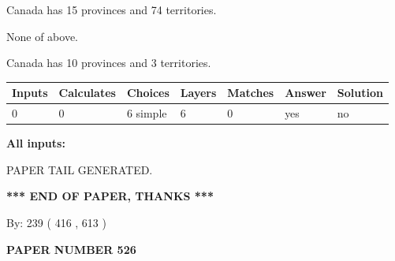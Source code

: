 \documentclass[12pt]{article}
\begin{document}
 
Canada has  15 provinces and  74 territories.
 
 
 None of above.
 
 
\noindent{}
 
 
Canada has 10  provinces and 3 territories.
 
 
\noindent{}
 
 
   
   
   
   
\noindent\begin{tabular}{|l|l|l|l|l|l|l|}
 \hline
Inputs & Calculates & Choices & Layers & Matches & Answer & Solution \\ \hline
 0  & 
 0  & 
 6
  simple  
  & 
 6  & 
 0  & 
  yes & 
  no 
  \\ \hline
 \end{tabular}
   
   
   
   
\noindent{}
   
   
   
   
\noindent\vspace{0.1in}\hspace{-0.08in} {\textbf{\Large{All inputs: }}}
   
   
   
   
   
   
 \vspace{0.2in}
 
   
   
\vspace{2.0in} PAPER TAIL GENERATED.
   
   
   
   
\vspace{1.0in} 
{\textbf{\large{ *** END OF PAPER, THANKS *** }}} 
   
   
\hspace{1.0in} By: 
 239 ( 416 ,  613 )
   
   
   
   
\newpage 
\setcounter{page}{ 
   526001 } 
   
   
   
   
 {\textbf{ \Large{ PAPER NUMBER  526  }}}
   
\end{document}
